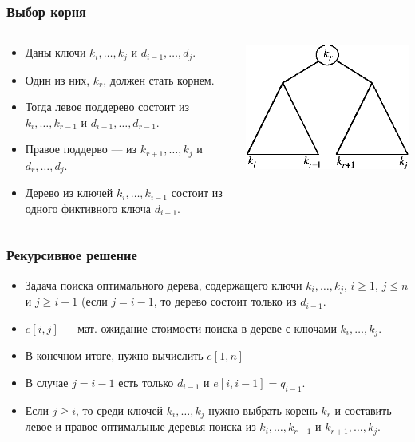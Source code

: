 \documentclass[hyperref={unicode=true}]{beamer}
\begin{document}
\begin{frame}
  \frametitle{Выбор корня}
  \begin{columns}
    \begin{column}{.6\textwidth}
      \begin{itemize}
      \item Даны ключи $k_i, \ldots, k_j$ и $d_{i-1}, \ldots, d_j$. 
      \item Один из них, $k_r$, должен стать корнем. 
      \item Тогда левое поддерево состоит из $k_i, \ldots, k_{r-1}$ и
        $d_{i-1},\ldots, d_{r-1}$. 
      \item Правое поддерво --- из $k_{r+1}, \ldots, k_j$ и $d_r,
        \ldots, d_j$.
      \item Дерево из ключей $k_i, \ldots, k_{i-1}$ состоит из одного
        фиктивного ключа $d_{i-1}$.
      \end{itemize}
    \end{column}
    \begin{column}{.4\textwidth}
      \includegraphics{bst-opt-div.eps}
    \end{column}
  \end{columns}
\end{frame}

\begin{frame}
  \frametitle{Рекурсивное решение}
  \begin{itemize}
  \item Задача поиска оптимального дерева, содержащего ключи $k_i, \ldots,
  k_j$, $i \geq 1$, $j \leq n$ и $j \geq i -1 $ (если $j=i-1$, то
  дерево состоит только из $d_{i-1}$. 
  \item $e[i,j]$ --- мат. ожидание
  стоимости поиска в дереве с ключами $k_i, \ldots, k_j$. 
  \item В конечном итоге, нужно
  вычислить $e[1,n]$
  \item В случае $j=i-1$ есть только $d_{i-1}$ и $e[i,i-1] = q_{i-1}$.
  \item  Если $j \geq i$, то среди ключей $k_i, \ldots, k_j$ нужно
    выбрать корень $k_r$ и составить левое и правое оптимальные
    деревья поиска из $k_i, \ldots, k_{r-1}$ и $k_{r+1},\ldots, k_j$.
\end{itemize}
\end{frame}
\end{document}
